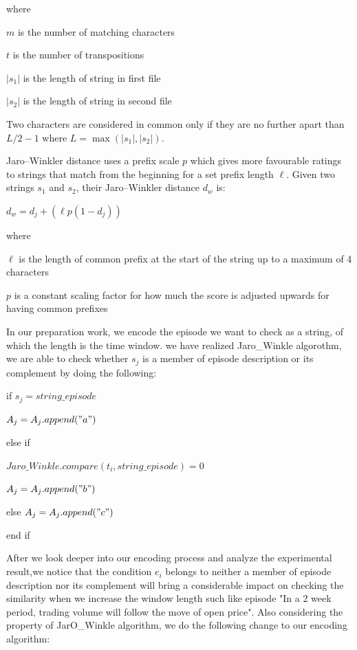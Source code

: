 \documentclass[10pt, conference, compsocconf]{IEEEtran}
\begin{document}
\par where 
\par\quad $m$ is the number of matching characters
\par\quad $t$ is the number of transpositions
\par\quad $\left | s_{1} \right |$ is the length of string in first file 
\par\quad $\left | s_{2} \right |$ is the length of string in second file
\vspace{1.2mm}
\par Two characters are considered in common only if they are no further apart than $L/2-1$ where $L = \max(\left | s_{1} \right |,\left |s_{2}  \right |)$.
\par

Jaro–Winkler distance uses a prefix scale $p$ which gives more favourable ratings to strings that match from the beginning for a set prefix length $\ell$. Given two strings $s_{1}$ and $s_{2}$, their Jaro–Winkler distance $d_{w}$ is:
\par\quad $d_{w}=d_{j}+(\ell p(1-d_{j}))$
\par where
\par\quad $\ell$ is the length of common prefix at the start of the string up to a maximum of 4 characters
\par\quad $p$ is a constant scaling factor for how much the score is adjusted upwards for having common prefixes
\par 

In our preparation work, we encode the episode we want to check as a string, of which the length is the time window. we have realized Jaro\_Winkle algorothm, we are able to check whether $s_{j}$ is a member of episode description or its complement by doing the following:
\vspace{1.2mm}
\par\quad if $s_{j}=string\_episode$
\par\quad $A_{j}=A_{j}.append("a")$
\par\quad else if 
\par\quad $Jaro\_Winkle.compare(t_{i},string\_episode)=0$
\par\quad $A_{j}=A_{j}.append("b")$
\par\quad else $A_{j}=A_{j}.append("c")$
\par\quad end if
\vspace{1.2mm}
\par

After we look deeper into our encoding process and analyze the experimental result,we notice that the condition $e_{i}$ belongs to neither a member of episode description nor its complement will bring a considerable impact on checking the similarity when we increase the window length such like episode "In a 2 week period, trading volume will follow the move of open price". Also considering the property of JarO\_Winkle algorithm, we do the following change to our encoding algorithm:
\vspace{1.2mm}
\par
\end{document}
